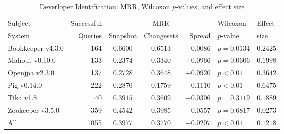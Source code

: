 \begin{table}[t]
\centering
\caption{Deverloper Identification: MRR, Wilcoxon $p$-values, and effect size}
\begin{tabular}{l|r|ccr|ll}
\toprule
Subject & Successful &    & MRR &        & Wilcoxon  & Effect \\
System  & Queries    & Snapshot & Changesets  & Spread & $p$-value & size \\
\midrule
Bookkeeper v4.3.0 & 164 & $\bm{0.6600}$ & $0.6513$ & $-0.0086$ & $p = 0.0134$ & $0.2425$ \\
Mahout v0.10.0 & 133 & $0.2374$ & $\bm{0.3340}$ & $+0.0966$ & $p = 0.0606$ & $0.1998$ \\
Openjpa v2.3.0 & 137 & $0.2728$ & $\bm{0.3648}$ & $+0.0920$ & $p < 0.01$ & $0.3642$ \\
Pig v0.14.0 & 222 & $\bm{0.2870}$ & $0.1759$ & $-0.1110$ & $p < 0.01$ & $0.6475$ \\
Tika v1.8 & 40 & $\bm{0.3915}$ & $0.3609$ & $-0.0306$ & $p = 0.3119$ & $0.1889$ \\
Zookeeper v3.5.0 & 359 & $\bm{0.4542}$ & $0.3985$ & $-0.0557$ & $p = 0.6817$ & $0.0273$ \\
\midrule
All & 1055 & $\bm{0.3977}$ & $0.3770$ & $-0.0207$ & $p < 0.01$ & $0.1218$ \\
\bottomrule
\end{tabular}
\label{table:triage_rq1}
\end{table}
